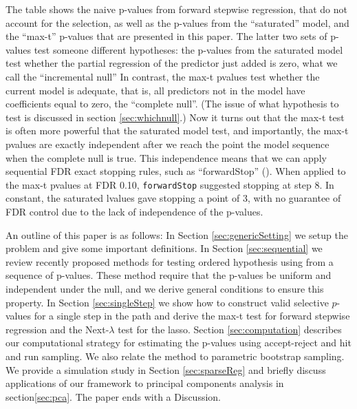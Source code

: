 \documentclass{article}
\begin{document}
The table shows the naive p-values from forward stepwise regression, that do not account for the selection, as well as the
p-values from the ``saturated'' model, and the ``max-t'' p-values that are presented in this paper.
The latter two sets of p-values test someone different hypotheses:  the p-values from the saturated model test whether the partial regression of the predictor just added is zero,
what we call the ``incremental null''
In contrast, the max-t pvalues test whether the current model is adequate, that is, all predictors not in the model  have coefficients equal to zero,
the ``complete null''. (The issue of what hypothesis to test is discussed in section \ref{sec:whichnull}.)
Now it turns out that the max-t test is often more powerful that the saturated model test, and importantly, the max-t pvalues are exactly
independent after we reach the point the model sequence when the complete null is true. This independence means that we can apply
sequential FDR exact stopping rules, such as ``forwardStop'' (\citet{gsell2013sequential}). When applied to the max-t pvalues at FDR 0.10, {\tt forwardStop}
suggested stopping at step 8. In constant, the saturated lvalues gave stopping a point of 3, with no guarantee of FDR control
due to the lack of independence of the p-values.

An outline of this paper is as follows:
In Section \ref{sec:genericSetting} we setup the problem and give some important definitions. In Section \ref{sec:sequential} we review recently proposed methods for
testing ordered hypothesis using from a sequence of p-values. These method require that the p-values be uniform and independent under the null, and we derive general conditions
to ensure this property. In Section \ref{sec:singleStep}  we  show how to construct valid selective $p$-values for a single step in the path and derive the max-t test
for  forward stepwise regression and the Next-$\lambda$ test for the lasso. Section \ref{sec:computation}  describes our computational strategy for estimating the p-values using accept-reject and hit and run sampling. We also relate the method to parametric bootstrap sampling. We provide a simulation study in Section \ref{sec:sparseReg} and briefly discuss applications of our framework to
principal components analysis in section\ref{sec:pca}. The paper ends with a Discussion.


\end{document}
